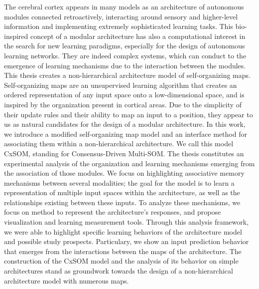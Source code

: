 \documentclass[11pt]{thesul-cs}
\begin{document}
\begin{ThesisAbstract}
\begin{FrenchAbstract}
  \end{FrenchAbstract}

  \begin{EnglishAbstract}
The cerebral cortex appears in many models as an architecture of autonomous modules connected retroactively, interacting around sensory and higher-level information and implementing extremely sophisticated learning tasks. 
This bio-inspired concept of a modular architecture has also a computational interest in the search for new learning paradigms, especially for the design of autonomous learning networks. They are indeed complex systems, which can conduct to the emergence of learning mechanisms due to the interaction between the modules.
This thesis creates a non-hierarchical architecture model of self-organizing maps.
Self-organizing maps are an unsupervised learning algorithm that creates an ordered representation of any input space onto a low-dimensional space, and is inspired by the organization present in cortical areas. 
Due to the simplicity of their update rules and their ability to map an input to a position, they appear to us as natural candidates for the design of a modular architecture.
In this work, we introduce a modified self-organizing map model and an interface method for associating them within a non-hierarchical architecture. We call this model CxSOM, standing for Consensus-Driven Multi-SOM.
The thesis constitutes an experimental analysis of the organization and learning mechanisms emerging from the association of those modules. 
We focus on highlighting associative memory mechanisms between several modalities; the goal for the model is to learn a representation of multiple input spaces within the architecture, as well as the relationships existing between these inputs.
To analyze these mechanisms, we focus on method to represent the architecture's responses, and propose visualization and learning measurement tools. Through this analysis framework, we were able to highlight specific learning behaviors of the architecture model and possible study prospects. Particulary, we show an input prediction behavior that emerges from the interactions between the maps of the architecture.
The construction of the CxSOM model and the analysis of its behavior on simple architectures stand as groundwork towards the design of a non-hierarchical architecture model with numerous maps.
   
    \end{EnglishAbstract}
  \end{ThesisAbstract}

\setcounter{tocdepth}{1}
\tableofcontents

%
\mainmatter











 \printbibliography
\end{document}

